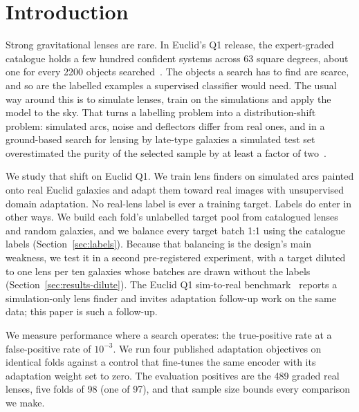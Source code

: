 \section{Introduction}
\label{sec:intro}

Strong gravitational lenses are rare. In Euclid's Q1 release, the expert-graded catalogue
holds a few hundred confident systems across 63 square degrees, about one for every 2200
objects searched~\citep{lines2025simstosky}. The objects a search has to find are scarce,
and so are the labelled examples a supervised classifier would need. The usual way around
this is to simulate lenses, train on the simulations and apply the model to the sky. That
turns a labelling problem into a distribution-shift problem: simulated arcs, noise and
deflectors differ from real ones, and in a ground-based search for lensing by late-type
galaxies a simulated test set overestimated the purity of the selected sample by at least a
factor of two~\citep{unions2025}.

We study that shift on Euclid Q1. We train lens finders on simulated arcs painted onto real
Euclid galaxies and adapt them toward real images with unsupervised domain adaptation. No
real-lens label is ever a training target. Labels do enter in other ways. We build each
fold's unlabelled target pool from catalogued lenses and random galaxies, and we balance
every target batch 1:1 using the catalogue labels (Section~\ref{sec:labels}). Because that
balancing is the design's main weakness, we test it in a second pre-registered experiment, with
a target diluted to one lens per ten galaxies whose batches are drawn without the labels
(Section~\ref{sec:results-dilute}). The Euclid Q1
sim-to-real benchmark~\citep{lines2025simstosky} reports a simulation-only lens finder and
invites adaptation follow-up work on the same data; this paper is such a follow-up.

We measure performance where a search operates: the true-positive rate at a false-positive
rate of $10^{-3}$. We run four published adaptation objectives on identical folds against a
control that fine-tunes the same encoder with its adaptation weight set to zero. The
evaluation positives are the 489 graded real lenses, five folds of 98 (one of 97), and that
sample size bounds every comparison we make.

